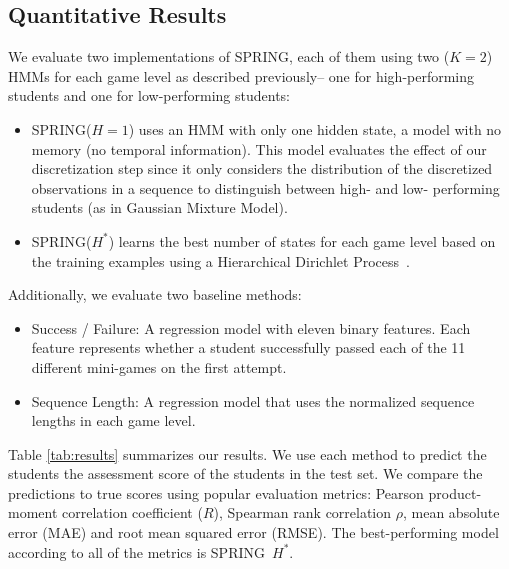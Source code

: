 \documentclass{sigchi}
\def\algname{SPRING\xspace}
\begin{document}
	\subsection{Quantitative Results}
	
	
	We evaluate two implementations of SPRING, each of them using two ($K=2$) HMMs for each game level as described previously-- one for high-performing students and one for low-performing students:
	
	\begin{itemize}
		\item \algname ($H=1$) uses an HMM with only one hidden state, a model with no memory (no temporal information). This model evaluates the effect of our discretization step since it only considers the distribution of the discretized observations in a sequence to distinguish between high- and low- performing students (as in Gaussian Mixture Model).

		\item \algname ($H^*$) learns the best number of states for each game level based on the training examples using a Hierarchical Dirichlet Process~\cite{fox2008hdp}.
	\end{itemize} 
	
	Additionally, we evaluate two baseline methods:
	\begin{itemize}
		\item Success / Failure: A regression model with eleven binary features. Each feature represents whether a student  successfully passed each of the 11 different mini-games on the first attempt.
		\item Sequence Length: A regression model that uses the normalized sequence lengths in each game level. 
	\end{itemize}
	
	Table \ref{tab:results} summarizes our results.
	We use each method to predict the students the assessment score of the students in the test set.
	We compare the predictions to true scores using popular evaluation metrics:
	Pearson product-moment correlation coefficient ($R$), Spearman rank correlation $\rho$, mean absolute error (MAE) and root mean squared error (RMSE). 
	The best-performing model according to all of the metrics is \algname~$H^*$. 
		
\end{document}
